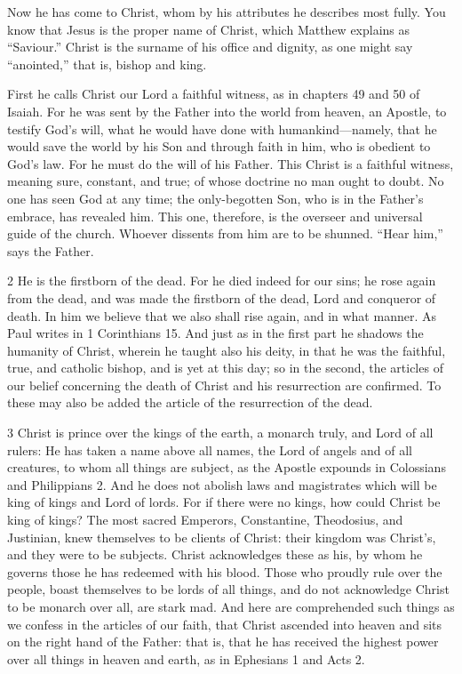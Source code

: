 Now he has come to Christ, whom by his attributes he describes most fully. You know that Jesus is the proper name of Christ, which Matthew explains as “Saviour.” Christ is the surname of his office and dignity, as one might say “anointed,” that is, bishop and king.

First he calls Christ our Lord a faithful witness, as in chapters 49 and 50 of Isaiah. For he was sent by the Father into the world from heaven, an Apostle, to testify God’s will, what he would have done with humankind—namely, that he would save the world by his Son and through faith in him, who is obedient to God’s law. For he must do the will of his Father. This Christ is a faithful witness, meaning sure, constant, and true; of whose doctrine no man ought to doubt. No one has seen God at any time; the only-begotten Son, who is in the Father’s embrace, has revealed him. This one, therefore, is the overseer and universal guide of the church. Whoever dissents from him are to be shunned. “Hear him,” says the Father.

2 He is the firstborn of the dead. For he died indeed for our sins; he rose again from the dead, and was made the firstborn of the dead, Lord and conqueror of death. In him we believe that we also shall rise again, and in what manner. As Paul writes in 1 Corinthians 15. And just as in the first part he shadows the humanity of Christ, wherein he taught also his deity, in that he was the faithful, true, and catholic bishop, and is yet at this day; so in the second, the articles of our belief concerning the death of Christ and his resurrection are confirmed. To these may also be added the article of the resurrection of the dead.

3 Christ is prince over the kings of the earth, a monarch truly, and Lord of all rulers: He has taken a name above all names, the Lord of angels and of all creatures, to whom all things are subject, as the Apostle expounds in Colossians and Philippians 2. And he does not abolish laws and magistrates which will be king of kings and Lord of lords. For if there were no kings, how could Christ be king of kings? The most sacred Emperors, Constantine, Theodosius, and Justinian, knew themselves to be clients of Christ: their kingdom was Christ's, and they were to be subjects. Christ acknowledges these as his, by whom he governs those he has redeemed with his blood. Those who proudly rule over the people, boast themselves to be lords of all things, and do not acknowledge Christ to be monarch over all, are stark mad. And here are comprehended such things as we confess in the articles of our faith, that Christ ascended into heaven and sits on the right hand of the Father: that is, that he has received the highest power over all things in heaven and earth, as in Ephesians 1 and Acts 2.

